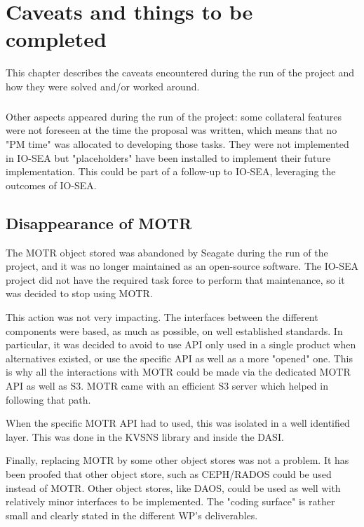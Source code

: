 \chapter{Caveats and things to be completed}

This chapter describes the caveats encountered during the run of the project and how they were solved and/or
worked around.

\paragraph{}
Other aspects appeared during the run of the project: some collateral features were not foreseen at the time the
proposal was written, which means that no "PM time" was allocated to developing those tasks. They were not 
implemented in IO-SEA but "placeholders" have been installed to implement their future implementation.  This could
be part of a follow-up to IO-SEA, leveraging the outcomes of IO-SEA. 

\section{Disappearance of MOTR}

The MOTR object stored was abandoned by Seagate during the run of the project, and it was no longer maintained as
an open-source software. The IO-SEA project did not have the required task force to perform that maintenance, so 
it was decided to stop using MOTR.

This action was not very impacting. The interfaces between the different components were based, as much as 
possible, on well established standards. In particular, it was decided to avoid to use API only used in a single
product when alternatives existed, or use the specific API as well as a more "opened" one. This is why all the
interactions with MOTR could be made via the dedicated MOTR API as well as S3. MOTR came with an efficient S3 
server which helped in following that path. 

When the specific MOTR API had to used, this was isolated in a well identified layer. This was done in the 
KVSNS library and inside the DASI. 

Finally, replacing MOTR by some other object stores was not a problem. It has been proofed that other object
store, such as CEPH/RADOS could be used instead of MOTR. Other object stores, like DAOS, could be used as well 
with relatively minor interfaces to be implemented. The "coding surface" is rather small and clearly stated in
the different WP's deliverables. 

